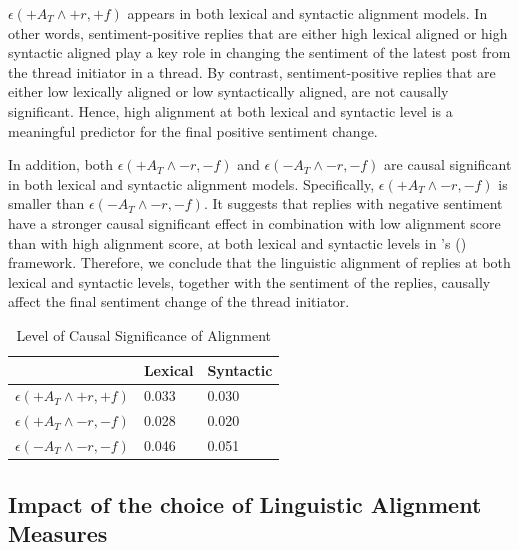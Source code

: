 \documentclass[man,biblatex,floatsintext]{apa6}
\newcommand{\citegen}[1]{\citeauthor{#1}'s (\citeyear{#1})}
\begin{document}
$\epsilon(+A_T \wedge +r, +f)$ appears in both lexical and syntactic alignment models. In other words, sentiment-positive replies that are either high lexical aligned or high syntactic aligned play a key role in changing the sentiment of the latest post from the thread initiator in a thread. By contrast, sentiment-positive replies that are either low lexically aligned or low syntactically aligned, are not causally significant. Hence, high alignment at both lexical and syntactic level is a meaningful predictor for the final positive sentiment change.

In addition, both $\epsilon(+A_{T} \wedge -r, -f)$ and $\epsilon(-A_{T} \wedge -r, -f)$ are causal significant in both lexical and syntactic alignment models. Specifically, $\epsilon(+A_{T}\wedge -r, -f)$ is smaller than $\epsilon(-A_{T} \wedge -r, -f)$. It suggests that replies with negative sentiment have a stronger causal significant effect in combination with low alignment score than with high alignment score, at both lexical and syntactic levels in  \citegen{kleinberg_uai09}  framework. Therefore, we conclude that the linguistic alignment of replies at both lexical and syntactic levels, together with the sentiment of the replies, causally affect the final sentiment change of the thread initiator.


\begin{table}[]
\centering
\begin{tabular}{l|l|l}
                             & Lexical & Syntactic \\ \hline
$\epsilon(+A_{T} \wedge +r, +f)$ & 0.033   & 0.030     \\ \hline
$\epsilon(+A_{T} \wedge -r, -f)$ & 0.028   & 0.020     \\ \hline
$\epsilon(-A_{T} \wedge -r, -f)$ & 0.046   & 0.051     \\ \hline
\end{tabular}
\caption{Level of Causal Significance of Alignment}
\label{tab:CausalSig}
\end{table}


\subsection{Impact of the choice of Linguistic Alignment Measures}
\end{document}
